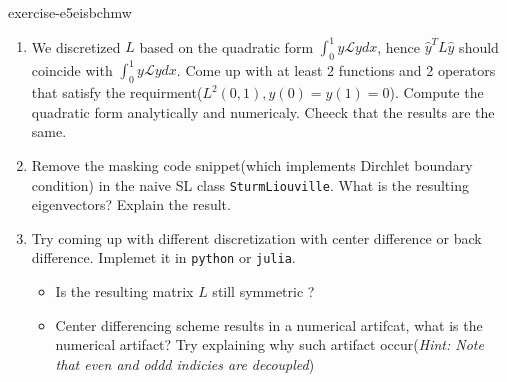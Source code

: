\begin{mystexercise}{}{exercise-e5eisbchmw}\label{exercise-E5EisbCHMW}\label{exercise-e5eisbchmw}\begin{enumerate}
\item We discretized $L$ based on the quadratic form $\int_0^1 y\mathcal L y dx$, hence $\hat y^T L\hat y$ should coincide with $\int_0^1 y\mathcal L y dx$. Come up with at least 2 functions and 2 operators that satisfy the requirment($L^2(0,1),y(0)=y(1)=0$). Compute the quadratic form analytically and numericaly. Cheeck that the results are the same.
\item Remove the masking code snippet(which implements Dirchlet boundary condition) in the naive SL class \texttt{SturmLiouville}. What is the resulting eigenvectors? Explain the result.
\item Try coming up with different discretization with center difference or back difference. Implemet it in \texttt{python}
or \texttt{julia}.

\begin{itemize}
\item Is the resulting matrix $L$ still symmetric ?
\item Center differencing scheme results in a numerical artifcat, what is the numerical artifact? Try explaining why such artifact occur(\textit{Hint: Note that even and oddd indicies are decoupled})
\end{itemize}
\end{enumerate}

\end{mystexercise}
%  
% 
%